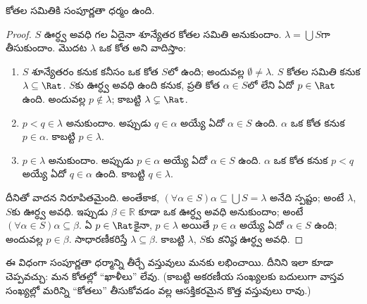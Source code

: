 \documentclass[../../../include/open-logic-section]{subfiles}
\begin{document}
\begin{thm}
కోతల సమితికి సంపూర్ణతా ధర్మం ఉంది.
\end{thm}

\begin{proof}
$S$ ఊర్ధ్వ అవధి గల ఏదైనా శూన్యేతర కోతల సమితి అనుకుందాం.
$\lambda = \bigcup S$గా తీసుకుందాం.
మొదట $\lambda$ ఒక కోత అని వాదిస్తాం:
\begin{enumerate}
\item $S$ శూన్యేతరం కనుక కనీసం ఒక కోత $S$లో ఉంది; అందువల్ల
$\emptyset \neq \lambda$. $S$ కోతల సమితి కనుక $\lambda
\subseteq \Rat$. $S$కు ఊర్ధ్వ అవధి ఉంది కనుక, ప్రతి కోత
$\alpha \in S$లో లేని ఏదో $p \in \Rat$ ఉంది. అందువల్ల
$p\notin \lambda$; కాబట్టి $\lambda \subsetneq \Rat$.
\item $p < q \in \lambda$ అనుకుందాం. అప్పుడు $q \in \alpha$ అయ్యే
ఏదో $\alpha \in S$ ఉంది. $\alpha$ ఒక కోత కనుక $p \in \alpha$.
కాబట్టి $p \in \lambda$.
\item $p \in \lambda$ అనుకుందాం. అప్పుడు $p \in \alpha$ అయ్యే
ఏదో $\alpha \in S$ ఉంది. $\alpha$ ఒక కోత కనుక $p < q$ అయ్యే
ఏదో $q \in \alpha$ ఉంది. కాబట్టి $q \in \lambda$.
\end{enumerate}
దీనితో వాదన నిరూపితమైంది. అంతేకాక,
$(\forall \alpha \in S)\alpha \subseteq \bigcup S = \lambda$
అనేది స్పష్టం; అంటే $\lambda$, $S$కు ఊర్ధ్వ అవధి. ఇప్పుడు
$\beta \in \mathbb{R}$ కూడా ఒక ఊర్ధ్వ అవధి అనుకుందాం; అంటే
$(\forall \alpha \in S)\alpha \subseteq \beta$. ఏ
$p \in \Rat$కైనా, $p \in \lambda$ అయితే $p \in \alpha$ అయ్యే
ఏదో $\alpha \in S$ ఉంది; అందువల్ల $p \in \beta$.
సాధారణీకరిస్తే $\lambda \subseteq \beta$. కాబట్టి $\lambda$,
$S$కు \emph{కనిష్ఠ} ఊర్ధ్వ అవధి.
\end{proof}

ఈ విధంగా సంపూర్ణతా ధర్మాన్ని తీర్చే వస్తువులు మనకు
లభించాయి. దీనిని ఇలా కూడా చెప్పవచ్చు: మన కోతల్లో ``ఖాళీలు'' లేవు.
(కాబట్టి అకరణీయ సంఖ్యలకు బదులుగా వాస్తవ సంఖ్యల్లో మరిన్ని ``కోతలు''
తీసుకోవడం వల్ల ఆసక్తికరమైన కొత్త వస్తువులు రావు.)
\end{document}
